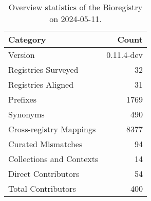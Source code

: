 \begin{table}
\caption{Overview statistics of the Bioregistry on 2024-05-11.}
\label{tab:bioregistry-summary}
\begin{tabular}{lr}
\toprule
Category & Count \\
\midrule
Version & 0.11.4-dev \\
Registries Surveyed & 32 \\
Registries Aligned & 31 \\
Prefixes & 1769 \\
Synonyms & 490 \\
Cross-registry Mappings & 8377 \\
Curated Mismatches & 94 \\
Collections and Contexts & 14 \\
Direct Contributors & 54 \\
Total Contributors & 400 \\
\bottomrule
\end{tabular}
\end{table}
